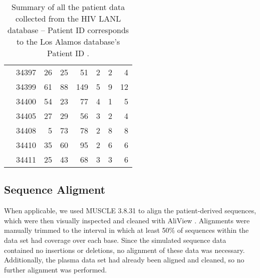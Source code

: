 \begin{table*}[!ht]
\begin{center}
\begin{tabular}{llrrrrrr}
& 34397 &      26 &       25 &       51 &        2 &        2 &        4  \\ 
& 34399 &      61 &       88 &      149 &        5 &        9 &       12  \\ 
& 34400 &      54 &       23 &       77 &        4 &        1 &        5  \\ 
& 34405 &      27 &       29 &       56 &        3 &        2 &        4  \\ 
& 34408 &       5 &       73 &       78 &        2 &        8 &        8 \\ 
& 34410 &      35 &       60 &       95 &        2 &        6 &        6 \\ 
& 34411 &      25 &       43 &       68 &        3 &        3 &        6   \\ \hline
\end{tabular}
\end{center}
  \caption{Summary of all the patient data collected from the HIV LANL database -- Patient ID corresponds to the Los Alamos database's Patient ID \citep{LosAlamos}.
   }\label{tab:patients} 
\end{table*}

\subsection * {Sequence Aligment} \label{subsec:seqalign}
When applicable, we used MUSCLE 3.8.31 \citep{Muscle04} to align the patient-derived sequences, which were then visually inspected and cleaned with AliView \citep{AliView14}. 
Alignments were manually trimmed to the interval in which at least  50\% of sequences within the data set had coverage over each base.
Since the simulated sequence data contained no insertions or deletions, no alignment of these data was necessary. 
Additionally, the plasma data set \citep{McCloskey14} had already been aligned and cleaned, so no further alignment was performed.


